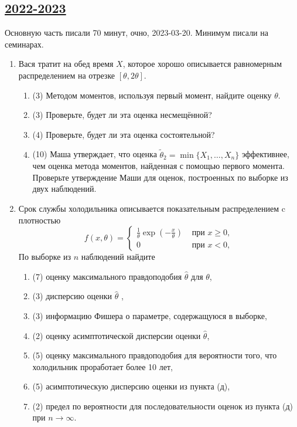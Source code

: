 \subsection[2022-2023]{\hyperref[sec:sol_kr_03_2022_2023]{2022-2023}}
\label{sec:kr_03_2022_2023}

Основную часть писали 70 минут, очно, 2023-03-20. Минимум писали на семинарах. 

\begin{enumerate}
  \item Вася тратит на обед время $X$, которое хорошо описывается равномерным распределением на отрезке $[ \theta, 2 \theta ]$. 

  \begin{enumerate}
  \setlength\itemsep{0.01cm}
  \item (3) Методом моментов, используя первый момент, найдите оценку $\theta$.
  \item (3) Проверьте, будет ли эта оценка несмещённой?
  \item (4) Проверьте, будет ли эта оценка состоятельной?
  \item (10) Маша утверждает, что оценка $\tilde{\theta}_2 = \min\{X_1, \ldots, X_n\}$ эффективнее, чем оценка метода моментов, найденная с помощью первого момента. 
  Проверьте утверждение Маши для оценок, построенных по выборке из двух наблюдений.
  \end{enumerate}
  

  \item Срок службы холодильника описывается показательным распределением c плотностью 
  \[
  f(x,\theta) =
  \begin{cases}
  \frac{1}{\theta}  \exp(-\frac{x}{\theta}) & \text{ при } x \geq 0, \\
  0 & \text{ при } x < 0,
  \end{cases}
  \] 
  По выборке из $n$ наблюдений найдите
  \begin{enumerate}
  \item(7) оценку максимального правдоподобия  $\hat{\theta}$ для $\theta$,
  \item (3)  дисперсию оценки  $\hat{\theta}$ ,
  \item (3)  информацию Фишера о параметре, содержащуюся в выборке,
  \item (2) оценку асимптотической дисперсии оценки  $\hat{\theta}$,
  \item (5)  оценку максимального правдоподобия для вероятности того, что холодильник проработает более 10 лет,
  \item (5)  асимптотическую дисперсию оценки из пункта (д),
  \item (2)  предел по вероятности для последовательности оценок из пункта (д) при $n \to \infty$.
  \end{enumerate}
  

\end{enumerate}
